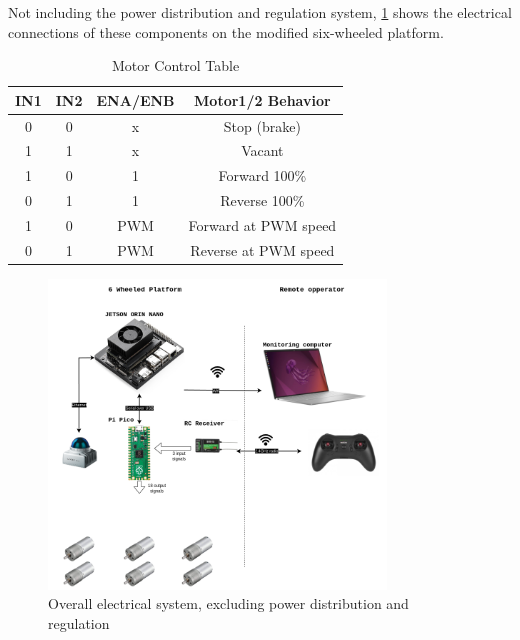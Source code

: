 \documentclass[11pt]{article}
\begin{document}
                Not including the power distribution and regulation system, \ref{fig:overall_electical_system} shows the electrical connections of these components on the modified six-wheeled platform.


                \begin{table}[h!]
                    \centering
                    \begin{tabular}{|c|c|c|c|}
                    \hline
                    IN1 & IN2 & ENA/ENB & Motor1/2 Behavior \\ \hline
                    0   & 0   & x       & Stop (brake)      \\ \hline
                    1   & 1   & x       & Vacant            \\ \hline
                    1   & 0   & 1       & Forward 100\%     \\ \hline
                    0   & 1   & 1       & Reverse 100\%     \\ \hline
                    1   & 0   & PWM     & Forward at PWM speed \\ \hline
                    0   & 1   & PWM     & Reverse at PWM speed \\ \hline
                    \end{tabular}
                    \caption{Motor Control Table}
                    \label{tab:motor_control}
                \end{table}

                \begin{figure}[H]
                    \centering
                    
                    \includegraphics[width=0.8\textwidth]{Images/PFE-Page-2.drawio.png}
                    \caption{Overall electrical system, excluding power distribution and regulation}
                    \label{fig:overall_electical_system}
                \end{figure}
\end{document}
